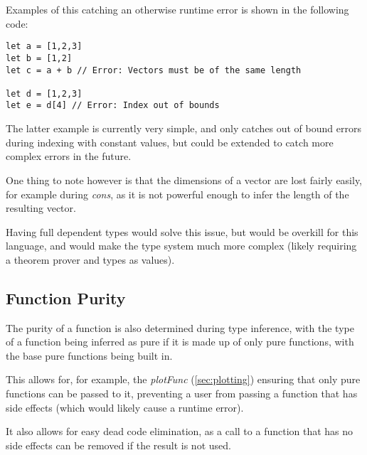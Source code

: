 Examples of this catching an otherwise runtime error is shown in the following code:

\begin{verbatim}
let a = [1,2,3]
let b = [1,2]
let c = a + b // Error: Vectors must be of the same length
    
let d = [1,2,3]
let e = d[4] // Error: Index out of bounds
\end{verbatim}

The latter example is currently very simple, and only catches out of bound errors during indexing with constant 
values, but could be extended to catch more complex errors in the future.
    
One thing to note however is that the dimensions of a vector are lost fairly easily, for example during 
\textit{cons}, as it is not powerful enough to infer the length of the resulting vector.

Having full dependent types would solve this issue, but would be overkill for this language, and would make the
type system much more complex (likely requiring a theorem prover and types as values).

\subsection{Function Purity}\label{subsec:function-purity}

The purity of a function is also determined during type inference, with the type of a function being inferred as
pure if it is made up of only pure functions, with the base pure functions being built in.

This allows for, for example, the \textit{plotFunc} (\ref{sec:plotting}) ensuring that only pure functions can be 
passed to it, preventing a user from passing a function that has side effects (which would likely cause a runtime error).

It also allows for easy dead code elimination, as a call to a function that has no side effects can be removed if the
result is not used.
